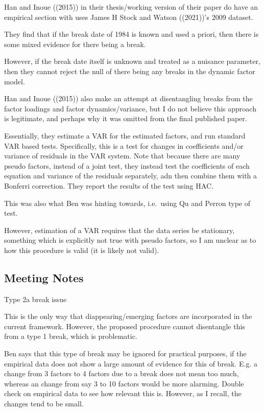 \documentclass[
]{article}
\begin{document}
Han and Inoue ((2015)) in their thesis/working version of their paper do
have an empirical section with uses James H Stock and Watson ((2021))'s
2009 dataset.

They find that if the break date of 1984 is known and used a priori,
then there is some mixed evidence for there being a break.

However, if the break date itself is unknown and treated as a nuisance
parameter, then they cannot reject the null of there being any breaks in
the dynamic factor model.

Han and Inoue ((2015)) also make an attempt at disentangling breaks from
the factor loadings and factor dynamics/variance, but I do not believe
this approach is legitimate, and perhaps why it was omitted from the
final published paper.

Essentially, they estimate a VAR for the estimated factors, and run
standard VAR based tests. Specifically, this is a test for changes in
coefficients and/or variance of residuals in the VAR system. Note that
because there are many pseudo factors, instead of a joint test, they
instead test the coefficients of each equation and variance of the
residuals separately, adn then combine them with a Bonferri correction.
They report the results of the test using HAC.

This was also what Ben was hinting towards, i.e.~using Qu and Perron
type of test.

However, estimation of a VAR requires that the data series be
stationary, something which is explicitly not true with pseudo factors,
so I am unclear as to how this procedure is valid (it is likely not
valid).

\hypertarget{meeting-notes}{%
\subsection{Meeting Notes}\label{meeting-notes}}

Type 2a break issue

This is the only way that diappearing/emerging factors are incorporated
in the current framework. However, the proposed procedure cannot
disentangle this from a type 1 break, which is problematic.

Ben says that this type of break may be ignored for practical purposes,
if the empirical data does not show a large amount of evidence for this
of break. E.g. a change from 3 factors to 4 factors due to a break does
not mean too much, whereas an change from say 3 to 10 factors would be
more alarming. Double check on empirical data to see how relevant this
is. However, as I recall, the changes tend to be small.
\end{document}
